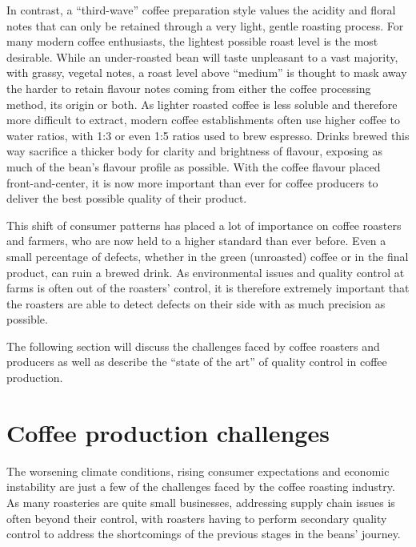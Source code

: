 In contrast, a ``third-wave'' coffee preparation style values the acidity and floral
notes that can only be retained through a very light, gentle roasting process. For
many modern coffee enthusiasts, the lightest possible roast level is the most
desirable. While an under-roasted bean will taste unpleasant to a vast majority,
with grassy, vegetal notes, a roast level above ``medium'' is thought to mask
away the harder to retain flavour notes coming from either the coffee processing
method, its origin or both. As lighter roasted coffee is less soluble and
therefore more difficult to extract, modern coffee establishments often use higher
coffee to water ratios, with 1:3 or even 1:5 ratios used to brew espresso. Drinks
brewed this way sacrifice a thicker body for clarity and brightness of flavour,
exposing as much of the bean's flavour profile as possible. With the coffee flavour
placed front-and-center, it is now more important than ever for coffee producers
to deliver the best possible quality of their product.

This shift of consumer patterns has placed a lot of importance on coffee
roasters and farmers, who are now held to a higher standard than ever before.
Even a small percentage of defects, whether in the green (unroasted) coffee or in
the final product, can ruin a brewed drink. As environmental issues and quality control
at farms is often out of the roasters' control, it is therefore extremely important
that the roasters are able to detect defects on their side with as much precision
as possible.

The following section will discuss the challenges faced by coffee roasters and producers
as well as describe the ``state of the art'' of quality control in coffee production.

\section{Coffee production challenges}
\label{sec:coffee-production-challenges} The worsening climate conditions,
rising consumer expectations and economic instability are just a few of the
challenges faced by the coffee roasting industry. As many roasteries are quite small
businesses, addressing supply chain issues is often beyond their control, with roasters
having to perform secondary quality control to address the shortcomings of the previous
stages in the beans' journey.


